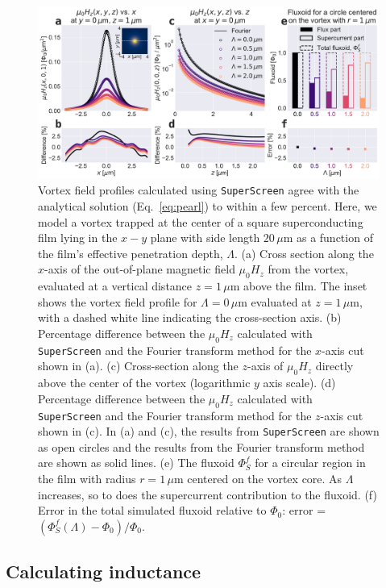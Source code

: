 \documentclass[final,3p,times,twocolumn]{elsarticle}
\newcommand{\inline}[1]{\texttt{#1}\xspace}
\newcommand{\SuperScreen}{\inline{SuperScreen}}
\newcommand{\um}{\mu\mathrm{m}}
\begin{document}
\begin{figure}[h!]
    \centering
    \includegraphics[width=\textwidth]{examples/images/pearl.pdf}
    \caption{Vortex field profiles calculated using \SuperScreen agree with the analytical solution (Eq.~\ref{eq:pearl}) to within a few percent. Here, we model a vortex trapped at the center of a square superconducting film lying in the $x-y$ plane with side length $20\,\um$ as a function of the film's effective penetration depth, $\Lambda$. (a) Cross section along the $x$-axis of the out-of-plane magnetic field $\mu_0H_z$ from the vortex, evaluated at a vertical distance $z=1\,\um$ above the film. The inset shows the vortex field profile for $\Lambda=0\,\um$ evaluated at $z=1\,\um$, with a dashed white line indicating the cross-section axis. (b) Percentage difference between the $\mu_0H_z$ calculated with \SuperScreen and the Fourier transform method for the $x$-axis cut shown in (a). (c) Cross-section along the $z$-axis of $\mu_0H_z$ directly above the center of the vortex (logarithmic $y$ axis scale). (d) Percentage difference between the $\mu_0H_z$ calculated with \SuperScreen and the Fourier transform method for the $z$-axis cut shown in (c). In (a) and (c), the results from \SuperScreen are shown as open circles and the results from the Fourier transform method are shown as solid lines. (e) The fluxoid $\Phi_S^f$ for a circular region in the film with radius $r=1\,\um$ centered on the vortex core. As $\Lambda$ increases, so to does the supercurrent contribution to the fluxoid. (f) Error in the total simulated fluxoid relative to $\Phi_0$: error = $(\Phi_S^f(\Lambda) - \Phi_0) / \Phi_0$.}
    \label{fig:pearl}
\end{figure}

\subsection{Calculating inductance}
\label{section:examples:inductance}
\end{document}
